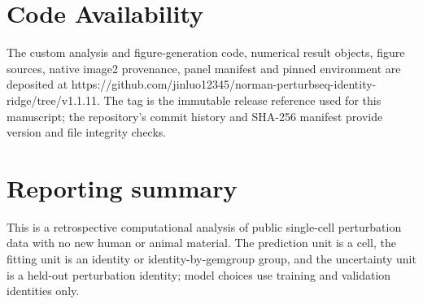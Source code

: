 \documentclass[10pt]{article}
\begin{document}
\section{Code Availability}
The custom analysis and figure-generation code, numerical result objects, figure sources, native image2 provenance, panel manifest and pinned environment are deposited at https://github.com/jinluo12345/norman-perturbseq-identity-ridge/tree/v1.1.11. The tag is the immutable release reference used for this manuscript; the repository's commit history and SHA-256 manifest provide version and file integrity checks.

\section{Reporting summary}
This is a retrospective computational analysis of public single-cell perturbation data with no new human or animal material. The prediction unit is a cell, the fitting unit is an identity or identity-by-gemgroup group, and the uncertainty unit is a held-out perturbation identity; model choices use training and validation identities only.
\end{document}
